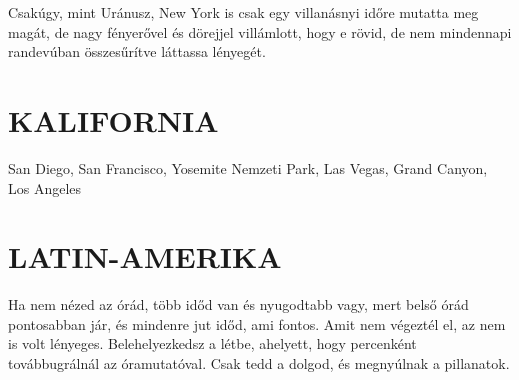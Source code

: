 Csakúgy, mint Uránusz, New York is csak egy villanásnyi időre
mutatta meg magát, de nagy fényerővel és dörejjel villámlott, hogy e
rövid, de nem mindennapi randevúban összesűrítve láttassa lényegét.

\chapter{KALIFORNIA}

San Diego, San Francisco, Yosemite Nemzeti Park, Las Vegas, Grand
Canyon, Los Angeles

\chapter{LATIN-AMERIKA}

\begin{itshape}
Ha nem nézed az órád, több időd van és nyugodtabb vagy, mert belső órád
pontosabban jár, és mindenre jut időd, ami fontos. Amit nem végeztél el, az
nem is volt lényeges. Belehelyezkedsz a létbe, ahelyett, hogy percenként
továbbugrálnál az óramutatóval. Csak tedd a dolgod, és megnyúlnak a pillanatok.
\end{itshape}
